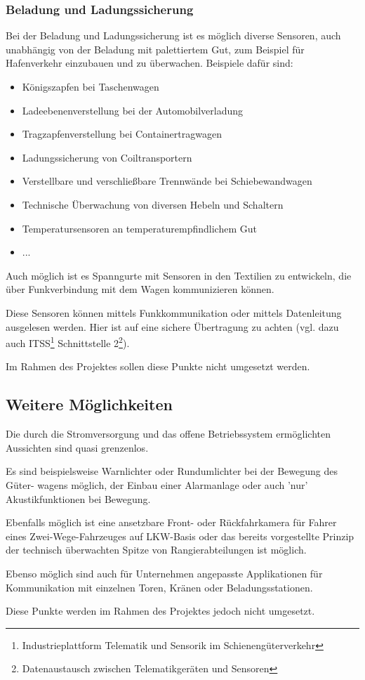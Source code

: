 \subsubsection{Beladung und Ladungssicherung}
Bei der Beladung und Ladungssicherung ist es möglich diverse Sensoren, auch unabhängig von der Beladung mit palettiertem Gut, zum Beispiel für Hafenverkehr einzubauen und zu überwachen. Beispiele dafür sind:
\begin{itemize}
    \item Königszapfen bei Taschenwagen
    \item Ladeebenenverstellung bei der Automobilverladung
    \item Tragzapfenverstellung bei Containertragwagen
    \item Ladungssicherung von Coiltransportern
    \item Verstellbare und verschließbare Trennwände bei Schiebewandwagen
    \item Technische Überwachung von diversen Hebeln und Schaltern
    \item Temperatursensoren an temperaturempfindlichem Gut
    \item ...
\end{itemize}
Auch möglich ist es Spanngurte mit Sensoren in den Textilien zu entwickeln, die über Funkverbindung mit dem Wagen kommunizieren können.\par
Diese Sensoren können mittels Funkkommunikation oder mittels Datenleitung ausgelesen werden. Hier ist auf eine sichere Übertragung zu achten (vgl. dazu auch ITSS\footnote{Industrieplattform Telematik und Sensorik im Schienengüterverkehr} Schnittstelle 2\footnote{Datenaustausch zwischen Telematikgeräten und Sensoren}).\par
Im Rahmen des Projektes sollen diese Punkte nicht umgesetzt werden.

\subsection{Weitere Möglichkeiten}
Die durch die Stromversorgung und das offene Betriebssystem ermöglichten Aussichten sind quasi grenzenlos.\par
Es sind beispielsweise Warnlichter oder Rundumlichter bei der Bewegung des Güter- wagens möglich, der Einbau einer Alarmanlage oder auch 'nur' Akustikfunktionen bei Bewegung.\par
Ebenfalls möglich ist eine ansetzbare Front- oder Rückfahrkamera für Fahrer eines Zwei-Wege-Fahrzeuges auf LKW-Basis oder das bereits vorgestellte Prinzip der technisch überwachten Spitze von Rangierabteilungen\cite{RTUS} ist möglich.\par
Ebenso möglich sind auch für Unternehmen angepasste Applikationen für Kommunikation mit einzelnen Toren, Kränen oder Beladungsstationen.\par
Diese Punkte werden im Rahmen des Projektes jedoch nicht umgesetzt.
